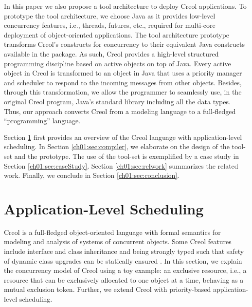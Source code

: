 In this paper we also propose a 
tool
architecture to deploy Creol applications. To prototype the tool
architecture, we choose Java as it provides low-level concurrency features, i.e., threads, futures, etc.,
required for multi-core deployment of object-oriented applications. The tool
architecture prototype transforms Creol's constructs for concurrency to their
equivalent Java constructs available in the
{} package. As such, Creol provides
a high-level structured programming discipline based on active objects on top of Java.
Every active object in Creol is transformed to an object in Java that uses a priority manager
and scheduler to respond to the incoming messages from other objects. Besides,
through this transformation, we allow the programmer to seamlessly use, in the
original Creol program, Java's standard library including all the data types.
Thus, our approach converts Creol from  a modeling language to a full-fledged
 ``programming'' language.

Section \ref{ch01:sec:creol} first provides an overview of the Creol language with application-level scheduling. 
In Section \ref{ch01:sec:compiler}, we elaborate on the design  of the tool-set and the
prototype. The use of the tool-set is exemplified by a case study in Section \ref{ch01:sec:caseStudy}.
Section \ref{ch01:sec:relwork} summarizes the related work. 
Finally, we conclude in Section \ref{ch01:sec:conclusion}.

%




\section{Application-Level Scheduling}
\label{ch01:sec:creol}

Creol \cite{creol:broch_owe} is a full-fledged object-oriented language with formal semantics for modeling and analysis of systems of concurrent objects. 
Some Creol features include interface and class inheritance and being strongly typed such that safety of dynamic class upgrades can be statically ensured \cite{yu06fmoods}.
In this section, we explain the concurrency model of Creol using a toy example: an exclusive resource, i.e., a
resource that can be exclusively allocated to one object at a time, behaving as a mutual exclusion token. 
Further, we extend Creol with priority-based application-level scheduling.

